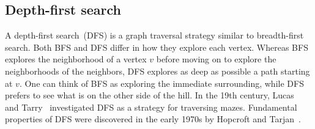 




\subsection{Depth-first search}

A depth-first search~(DFS) is a graph traversal strategy similar to
breadth-first search. Both BFS and DFS differ in how they explore each
vertex. Whereas BFS explores the neighborhood of a vertex $v$ before
moving on to explore the neighborhoods of the neighbors, DFS explores
as deep as possible a path starting at $v$. One can think of BFS as
exploring the immediate surrounding, while DFS prefers to see what is
on the other side of the hill. In the 19th century,
Lucas~\cite{Lucas1882.1894} and Tarry~\cite{Tarry1895} investigated
DFS as a strategy for traversing mazes. Fundamental properties of DFS
were discovered in the early 1970s by Hopcroft and
Tarjan~\cite{HopcroftTarjan1973,Tarjan1972}.

